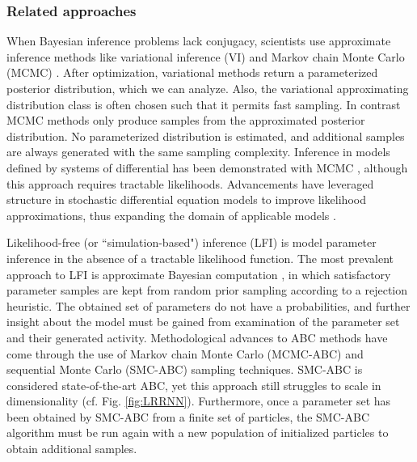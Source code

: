 \documentclass[11pt]{article}
\begin{document}
 \subsubsection{Related approaches}\label{methods_related}
 When Bayesian inference problems lack conjugacy, scientists use approximate inference methods like variational inference (VI) \cite{saul1998mean} and Markov chain Monte Carlo (MCMC) \cite{metropolis1953equation, hastings1970monte}. 
After optimization, variational methods return a parameterized posterior distribution, which we can analyze.
Also, the variational approximating distribution class is often chosen such that it permits fast sampling.
In contrast MCMC methods only produce samples from the approximated posterior distribution.
No parameterized distribution is estimated, and additional samples are always generated with the same sampling complexity.
Inference in models defined by systems of differential has been demonstrated with MCMC \cite{girolami2011riemann}, although this approach requires tractable likelihoods.
Advancements have leveraged structure in stochastic differential equation models to improve likelihood approximations, thus expanding the domain of applicable models \cite{golightly2011bayesian}.
 
Likelihood-free (or ``simulation-based") inference (LFI) \cite{cranmer2020frontier} is model parameter inference in the absence of a tractable likelihood function.
The most prevalent approach to LFI is approximate Bayesian computation \cite{beaumont2002approximate}, in which satisfactory parameter samples are kept from random prior sampling according to a rejection heuristic.
The obtained set of parameters do not have a probabilities, and further insight about the model must be gained from examination of the parameter set and their generated activity.
Methodological advances to ABC methods have come through the use of Markov chain Monte Carlo (MCMC-ABC) \cite{marjoram2003markov} and sequential Monte Carlo (SMC-ABC) \cite{sisson2007sequential} sampling techniques.
SMC-ABC is considered state-of-the-art ABC, yet this approach still struggles to scale in dimensionality (cf. Fig. \ref{fig:LRRNN}).
Furthermore, once a parameter set has been obtained by SMC-ABC from a finite set of particles, the SMC-ABC algorithm must be run again with a new population of initialized particles to obtain additional samples.
\end{document}
